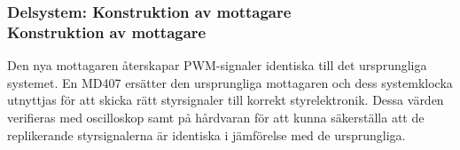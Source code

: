 \documentclass[a4paper]{article}
\begin{document}
\noindent

\subsubsection{Delsystem: Konstruktion av mottagare \\ Konstruktion av mottagare}
\vspace{5mm} \noindent
Den nya mottagaren återskapar PWM-signaler identiska till det ursprungliga systemet. En MD407 ersätter den ursprungliga mottagaren och dess systemklocka utnyttjas för att skicka rätt styrsignaler till korrekt styrelektronik. Dessa värden verifieras med oscilloskop samt på hårdvaran för att kunna säkerställa att de replikerande styrsignalerna är identiska i jämförelse med de ursprungliga. 









\end{document}
